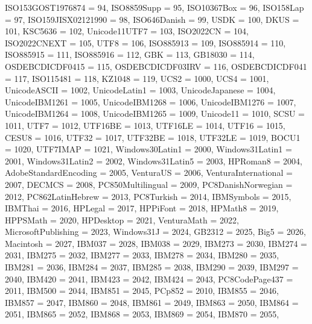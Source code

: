 \documentclass{wg21}
\begin{document}
\begin{addedblock}
\begin{codeblock}
{        ISO153GOST1976874 = 94,
        ISO8859Supp = 95,
        ISO10367Box = 96,
        ISO158Lap = 97,
        ISO159JISX02121990 = 98,
        ISO646Danish = 99,
        USDK = 100,
        DKUS = 101,
        KSC5636 = 102,
        Unicode11UTF7 = 103,
        ISO2022CN = 104,
        ISO2022CNEXT = 105,
        UTF8 = 106,
        ISO885913 = 109,
        ISO885914 = 110,
        ISO885915 = 111,
        ISO885916 = 112,
        GBK = 113,
        GB18030 = 114,
        OSDEBCDICDF0415 = 115,
        OSDEBCDICDF03IRV = 116,
        OSDEBCDICDF041 = 117,
        ISO115481 = 118,
        KZ1048 = 119,
        UCS2 = 1000,
        UCS4 = 1001,
        UnicodeASCII = 1002,
        UnicodeLatin1 = 1003,
        UnicodeJapanese = 1004,
        UnicodeIBM1261 = 1005,
        UnicodeIBM1268 = 1006,
        UnicodeIBM1276 = 1007,
        UnicodeIBM1264 = 1008,
        UnicodeIBM1265 = 1009,
        Unicode11 = 1010,
        SCSU = 1011,
        UTF7 = 1012,
        UTF16BE = 1013,
        UTF16LE = 1014,
        UTF16 = 1015,
        CESU8 = 1016,
        UTF32 = 1017,
        UTF32BE = 1018,
        UTF32LE = 1019,
        BOCU1 = 1020,
        UTF7IMAP = 1021,
        Windows30Latin1 = 2000,
        Windows31Latin1 = 2001,
        Windows31Latin2 = 2002,
        Windows31Latin5 = 2003,
        HPRoman8 = 2004,
        AdobeStandardEncoding = 2005,
        VenturaUS = 2006,
        VenturaInternational = 2007,
        DECMCS = 2008,
        PC850Multilingual = 2009,
        PC8DanishNorwegian = 2012,
        PC862LatinHebrew = 2013,
        PC8Turkish = 2014,
        IBMSymbols = 2015,
        IBMThai = 2016,
        HPLegal = 2017,
        HPPiFont = 2018,
        HPMath8 = 2019,
        HPPSMath = 2020,
        HPDesktop = 2021,
        VenturaMath = 2022,
        MicrosoftPublishing = 2023,
        Windows31J = 2024,
        GB2312 = 2025,
        Big5 = 2026,
        Macintosh = 2027,
        IBM037 = 2028,
        IBM038 = 2029,
        IBM273 = 2030,
        IBM274 = 2031,
        IBM275 = 2032,
        IBM277 = 2033,
        IBM278 = 2034,
        IBM280 = 2035,
        IBM281 = 2036,
        IBM284 = 2037,
        IBM285 = 2038,
        IBM290 = 2039,
        IBM297 = 2040,
        IBM420 = 2041,
        IBM423 = 2042,
        IBM424 = 2043,
        PC8CodePage437 = 2011,
        IBM500 = 2044,
        IBM851 = 2045,
        PCp852 = 2010,
        IBM855 = 2046,
        IBM857 = 2047,
        IBM860 = 2048,
        IBM861 = 2049,
        IBM863 = 2050,
        IBM864 = 2051,
        IBM865 = 2052,
        IBM868 = 2053,
        IBM869 = 2054,
        IBM870 = 2055,
}
\end{codeblock}
\end{addedblock}
\end{document}
